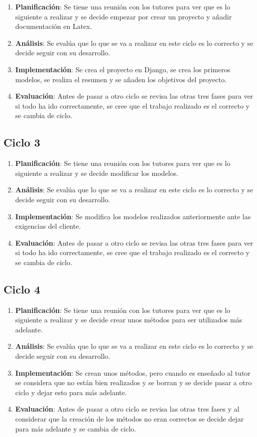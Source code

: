 \begin{enumerate}
	\item \textbf{Planificación}: Se tiene una reunión con los tutores para ver que es lo siguiente a realizar y se decide empezar por crear un proyecto y añadir documentación en Latex\cite{Latex}.
	\item \textbf{Análisis}: Se evalúa que lo que se va a realizar en este ciclo es lo correcto y se decide seguir con su desarrollo.
	\item \textbf{Implementación}: Se crea el proyecto en Django\cite{Django}, se crea los primeros modelos, se realiza el resumen y se añaden los objetivos del proyecto.
	\item \textbf{Evaluación}: Antes de pasar a otro ciclo se revisa las otras tres fases para ver si todo ha ido correctamente, se cree que el trabajo realizado es el correcto y se cambia de ciclo.
\end{enumerate}

\subsection{Ciclo 3}

\begin{enumerate}
	\item \textbf{Planificación}: Se tiene una reunión con los tutores para ver que es lo siguiente a realizar y se decide modificar los modelos.
	\item \textbf{Análisis}: Se evalúa que lo que se va a realizar en este ciclo es lo correcto y se decide seguir con su desarrollo.
	\item \textbf{Implementación}: Se modifica los modelos realizados anteriormente ante las exigencias del cliente.
	\item \textbf{Evaluación}: Antes de pasar a otro ciclo se revisa las otras tres fases para ver si todo ha ido correctamente, se cree que el trabajo realizado es el correcto y se cambia de ciclo.
\end{enumerate}

\subsection{Ciclo 4}

\begin{enumerate}
	\item \textbf{Planificación}: Se tiene una reunión con los tutores para ver que es lo siguiente a realizar y se decide crear unos métodos para ser utilizados más adelante.
	\item \textbf{Análisis}: Se evalúa que lo que se va a realizar en este ciclo es lo correcto y se decide seguir con su desarrollo.
	\item \textbf{Implementación}: Se crean unos métodos, pero cuando es enseñado al tutor se considera que no están bien realizados y se borran y se decide pasar a otro ciclo y dejar esto para más adelante.
	\item \textbf{Evaluación}: Antes de pasar a otro ciclo se revisa las otras tres fases y al considerar que la creación de los métodos no eran correctos se decide dejar para más adelante y se cambia de ciclo.
\end{enumerate}

